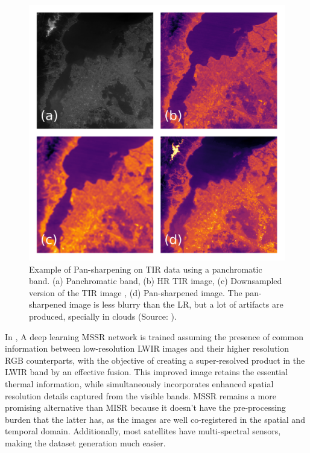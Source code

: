        \begin{figure}[H]
            \centering
            \includegraphics[width=\textwidth]{Includes/2-pansharpen.png}
            \caption{Example of Pan-sharpening on TIR data using a panchromatic band. (a) Panchromatic band, (b) HR TIR image, (c) Downsampled version of the TIR image , (d) Pan-sharpened image. 
            The pan-sharpened image is less blurry than the LR, but a lot of artifacts are produced, specially in clouds (Source: \cite{myself2023}).}
            \label{fig:2-pansharpening}
        \end{figure}

        In \cite{myself2023}, A deep learning MSSR network is trained assuming the presence of common information between low-resolution LWIR images and their higher resolution RGB counterparts, with the objective of creating a super-resolved product in the LWIR band by an effective fusion. This improved image retains the essential thermal information, while simultaneously incorporates enhanced spatial resolution details captured from the visible bands. 
        MSSR remains a more promising alternative than MISR because it doesn't have the pre-processing burden that the latter has, as the images are well co-registered in the spatial and temporal domain.
        Additionally, most satellites have multi-spectral sensors, making the dataset generation much easier.

